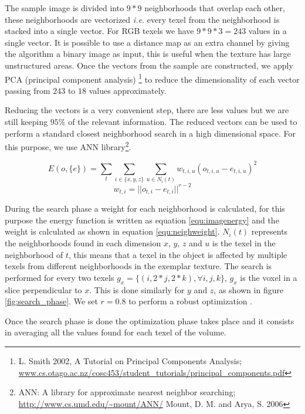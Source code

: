 The sample image is divided into $9*9$ neighborhoods that overlap each other, these neighborhoods are vectorized \emph{i.e.} 
every texel from the neighborhood is stacked into a single vector. For RGB texels we have $9 * 9 * 3 = 243$ 
values in a single vector. It is possible to 
use a distance map as an extra channel by giving the algorithm a binary image as input, 
this is useful when the texture has large unstructured areas.
Once the vectors from the sample are constructed, we apply PCA 
(principal component analysis) \footnote{L. Smith 2002, A Tutorial on Principal Components Analysis; \url{www.cs.otago.ac.nz/cosc453/student_tutorials/principal_components.pdf}}
to reduce the dimensionality of each vector passing from $243$ to $18$ values approximately.

Reducing the vectors is a very convenient step, there are less values but we are still keeping $95\%$ of the relevant information.
The reduced vectors can be used to perform a standard closest neighborhood search in a high dimensional space. 
For this purpose, we use ANN library\footnote{ANN: A library for approximate nearest neighbor searching; \url{http://www.cs.umd.edu/~mount/ANN/} Mount, D. M. and Arya, S. 2006}.

\begin{equation}
 E(o, \{e\} ) = \sum_{t} \sum_{i \in \{x, y, z\}} \sum_{u \in N_i(t)} w_{t, i, u} ( o_{t, i, u} - e_{t, i, u} )^2
 \label{equ:imagenergy} 
\end{equation}
\begin{equation}
 w_{t,i} = || o_{t, i} - e_{t, i} ||^{r - 2}
 \label{equ:neighweight}
\end{equation}

During the search phase a weight for each neighborhood is calculated, for this purpose the energy function 
is written as equation \ref{equ:imagenergy} and the weight is calculated
as shown in equation \ref{equ:neighweight}. $N_i(t)$ represents the neighborhoods found in each dimension $x$, $y$, $z$ 
and $u$ is the texel in the neighborhood of $t$, this means that
a texel in the object is affected by multiple texels from different neighborhoods in the exemplar texture. 
The search is performed for every two texels $g_x = \{(i, 2 * j, 2 * k), \forall i, j, k \} $, $g_x$ 
is the voxel in a slice perpendicular to $x$. This is done similarly for $y$ and $z$, as shown in figure \ref{fig:search_phase}.
We set $r = 0.8$ to perform a robust optimization \cite{kwatra:2005:SIGGRAPH}.

Once the search phase is done the optimization phase takes place and it consists in averaging 
all the values found for each texel of the volume. 


